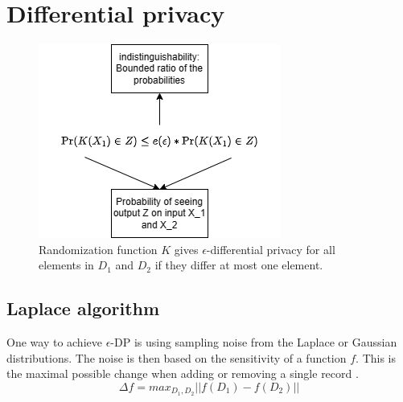 
\section{Differential privacy} \label{section:dp}
\glsaddall
\leading{10pt}
\printglossary[type=differential-privacy, nonumberlist]
\begin{figure}[h]
  \includegraphics{TheorethicalFramework/Differential privacy/master-thesis-Differential privacy illustration.png}
  \caption{Randomization function $K$ gives $\epsilon$-differential privacy for all elements in $D_1$ and $D_2$ if they differ at most one element. \citep{dwork_differential_2006}}
  \label{fig:definition-dp}
\end{figure}
\subsection{Laplace algorithm}
One way to achieve $\epsilon$-DP is using sampling noise from the Laplace or Gaussian distributions.
The noise is then based on the sensitivity of a function $f$.
This is the maximal possible change when adding or removing a single record \citep{friedman_data_2010, dwork_differential_2006}.
\begin{equation}
  \Delta f = max_{D_1, D_2} ||f(D_1) - f(D_2)||
\end{equation}



